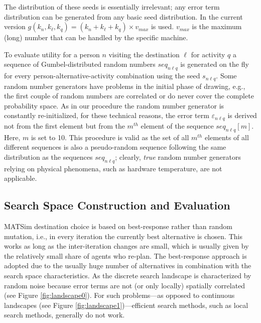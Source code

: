 The distribution of these seeds is essentially irrelevant; any error term distribution can be generated from any basic seed distribution. 
In the current version $g(k_n, k_\ell, k_q) = (k_n + k_\ell + k_q) \times v_{max}$ is used. $v_{max}$ is the maximum (long) number that can be handled by the specific machine.

To evaluate utility for a person $n$ visiting the destination $\ell$ for activity $q$ a sequence of Gumbel-distributed random numbers $seq_{n\ell q}$ is generated on the fly for every person-alternative-activity combination using the seed $s_{n\ell q}$. Some random number generators have problems in the initial phase of drawing, e.g., the first couple of random numbers are correlated or do never cover the complete probability space. As in our procedure the random number generator is constantly re-initialized, for these technical reasons, the error term $\varepsilon_{n\ell q}$ is derived not from the first element but from the $m^{th}$ element of the sequence $seq_{n\ell q}[m]$. Here, $m$ is set to 10. This procedure is valid as the set of all  $m^{th}$ elements of all different sequences is also a pseudo-random sequence following the same distribution as the sequences $seq_{n\ell q}$; clearly, \emph{true} random number generators relying on physical phenomena, such as hardware temperature, are not applicable. 

\subsection{Search Space Construction and Evaluation}
MATSim destination choice is based on best-response rather than random mutation, i.e., in every iteration the currently best alternative is chosen. This works as long as the inter-iteration changes are small, which is usually given by the relatively small share of agents who re-plan. The best-response approach is adopted due to the usually huge number of alternatives in combination with the search space characteristics. As the discrete search landscape is characterized by random noise because error terms are not (or only locally) spatially correlated (see Figure \ref{fig:landscape0}). For such problems---as opposed to continuous landscapes (see Figure \ref{fig:landscape1})---efficient search methods, such as local search methods, generally do not work.

